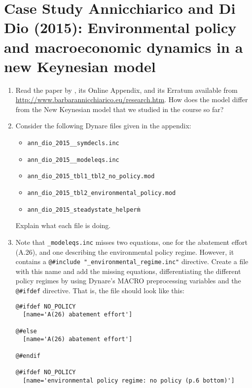 \section[Case Study Annicchiarico and Di Dio (2015): Environmental policy and macroeconomic dynamics in a new Keynesian model]{Case Study Annicchiarico and Di Dio (2015): Environmental policy and macroeconomic dynamics in a new Keynesian model\label{ex:CaseStudy.Annicchiarico.DiDio.2015}}

\begin{enumerate}
\item Read the paper by \textcite{Annicchiarico.DiDio_2015_EnvironmentalPolicyMacroeconomic},
  its Online Appendix, and its Erratum available from \url{http://www.barbarannicchiarico.eu/research.htm}.
How does the model differ from the New Keynesian model that we studied in the course so far?

\item Consider the following Dynare files given in the appendix:
\begin{itemize}
  \item \texttt{ann\_dio\_2015\_\_symdecls.inc}
  \item \texttt{ann\_dio\_2015\_\_modeleqs.inc}
  \item \texttt{ann\_dio\_2015\_tbl1\_tbl2\_no\_policy.mod}
  \item \texttt{ann\_dio\_2015\_tbl2\_environmental\_policy.mod}
  \item \texttt{ann\_dio\_2015\_steadystate\_helper\.m}
\end{itemize}
Explain what each file is doing.

\item Note that \texttt{\_modeleqs.inc} misses two equations, one for the abatement effort (A.26), and one describing the environmental policy regime.
However, it contains a \texttt{@\#include "\_environmental\_regime.inc"}  directive.
Create a file with this name and add the missing equations, differentiating the different policy regimes by using Dynare's MACRO preprocessing variables
  and the \texttt{@\#ifdef} directive. That is, the file should look like this:

{\footnotesize
\begin{lstlisting}[style=Matlab-editor,basicstyle=\mlttfamily\scriptsize]
@#ifdef NO_POLICY
  [name='A(26) abatement effort']
  
@#else
  [name='A(26) abatement effort']
  
@#endif

@#ifdef NO_POLICY
  [name='environmental policy regime: no policy (p.6 bottom)']
  

\end{lstlisting}}
\end{enumerate}
